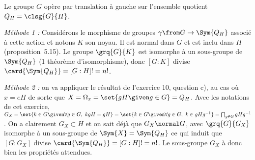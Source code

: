 Le groupe $G$ opère par translation à gauche sur l'ensemble quotient $Q_H = \smash{\clsg{G}{H}}$.

\emph{Méthode 1 :}
Considérons le morphisme de groupes $\gamma\from G\to\Sym{Q_H}$ associé à cette action et notons $K$ son noyau. 
Il est normal dans $G$ et est inclu dans $H$ (proposition~5.15).
Le groupe $\grq{G}{K}$ est isomorphe à un sous-groupe de $\Sym{Q_H}$ (1\ier{} théorème d'isomorphisme), donc $[G:K]$ divise $\card{\Sym{Q_H}} = [G:H]! = n!$.

\emph{Méthode 2 :} on va appliquer le résultat de l'exercice 10, question c), au cas où $x =eH$ de sorte que $X = \Omega_x = \set{gH \given g\in G} = Q_H $. Avec les notations de cet exercice, $G_X = \set{k\in G\given \forall g\in G,~ kgH = gH} = \set{k\in G\given \forall g\in G,~ k\in gHg^{-1}} = \bigcap_{g\in G} gHg^{-1}$. On a clairement $G_X\subset H$ et on sait déjà que $G_X\normal G$, avec $\grq{G}{G_X}$ isomorphe à un sous-groupe de $\Sym{X}= \Sym{Q_H}$ ce qui induit que $[G:G_X]$ divise $\card{\Sym{Q_H}} = [G:H]! = n!$. Le sous-groupe $G_X$ à donc bien les propriétés attendues.
